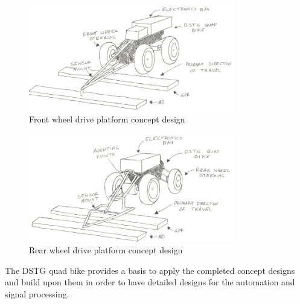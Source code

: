 \documentclass[main.tex]{subfiles}
\begin{document}
\begin{figure}[ht]
\includegraphics[width = 0.8\textwidth]{4-ConceptDesign/ConceptFront.jpeg}
\centering
\caption{Front wheel drive platform concept design} 
\end{figure}
\begin{figure}[ht]
\includegraphics[width = 0.8\textwidth]{4-ConceptDesign/ConceptRear.jpeg}
\centering
\caption{Rear wheel drive platform concept design} 
\end{figure}

The DSTG quad bike provides a basis to apply the completed concept designs and build upon them in order to have detailed designs for the automation and signal processing. 
\end{document}
